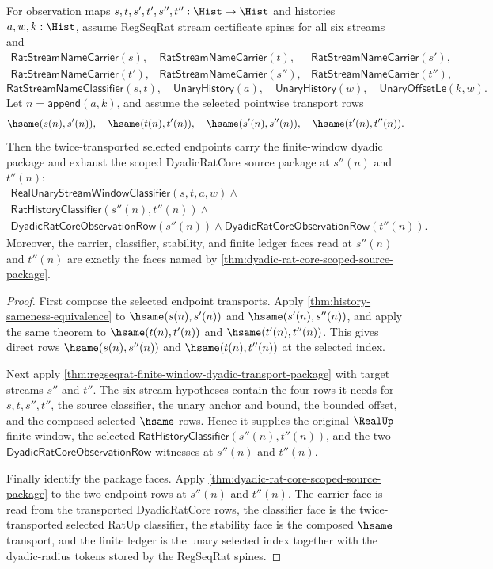 \begin{theorem}
\label{thm:regseqrat-finite-window-dyadic-transport-composition}
For observation maps $s,t,s',t',s'',t'':\Hist\to\Hist$ and histories
$a,w,k:\Hist$, assume RegSeqRat stream certificate spines for all six streams
and
$$
\begin{array}{lll}
\mathsf{RatStreamNameCarrier}(s),&
\mathsf{RatStreamNameCarrier}(t),&
\mathsf{RatStreamNameCarrier}(s'),\\
\mathsf{RatStreamNameCarrier}(t'),&
\mathsf{RatStreamNameCarrier}(s''),&
\mathsf{RatStreamNameCarrier}(t''),
\end{array}
$$
$$
\mathsf{RatStreamNameClassifier}(s,t),\quad
\mathsf{UnaryHistory}(a),\quad
\mathsf{UnaryHistory}(w),\quad
\mathsf{UnaryOffsetLe}(k,w).
$$
Let $n=\mathsf{append}(a,k)$, and assume the selected pointwise transport rows
$$
\hsame(s(n),s'(n)),\quad
\hsame(t(n),t'(n)),\quad
\hsame(s'(n),s''(n)),\quad
\hsame(t'(n),t''(n)).
$$
Then the twice-transported selected endpoints carry the finite-window dyadic
package and exhaust the scoped DyadicRatCore source package at $s''(n)$ and
$t''(n)$:
$$
\begin{array}{l}
\mathsf{RealUnaryStreamWindowClassifier}(s,t,a,w)\land\\
\mathsf{RatHistoryClassifier}(s''(n),t''(n))\land\\
\mathsf{DyadicRatCoreObservationRow}(s''(n))\land
\mathsf{DyadicRatCoreObservationRow}(t''(n)).
\end{array}
$$
Moreover, the carrier, classifier, stability, and finite ledger faces read at
$s''(n)$ and $t''(n)$ are exactly the faces named by
\autoref{thm:dyadic-rat-core-scoped-source-package}.
\end{theorem}
\begin{proof}
First compose the selected endpoint transports. Apply
\autoref{thm:history-sameness-equivalence} to
$\hsame(s(n),s'(n))$ and $\hsame(s'(n),s''(n))$, and apply the same theorem
to $\hsame(t(n),t'(n))$ and $\hsame(t'(n),t''(n))$. This gives direct rows
$\hsame(s(n),s''(n))$ and $\hsame(t(n),t''(n))$ at the selected index.

Next apply
\autoref{thm:regseqrat-finite-window-dyadic-transport-package} with target
streams $s''$ and $t''$. The six-stream hypotheses contain the four rows it
needs for $s,t,s'',t''$, the source classifier, the unary anchor and bound,
the bounded offset, and the composed selected $\hsame$ rows. Hence it supplies
the original $\RealUp$ finite window, the selected
$\mathsf{RatHistoryClassifier}(s''(n),t''(n))$, and the two
$\mathsf{DyadicRatCoreObservationRow}$ witnesses at $s''(n)$ and $t''(n)$.

Finally identify the package faces. Apply
\autoref{thm:dyadic-rat-core-scoped-source-package} to the two endpoint rows
at $s''(n)$ and $t''(n)$. The carrier face is read from the transported
DyadicRatCore rows, the classifier face is the twice-transported selected
RatUp classifier, the stability face is the composed $\hsame$ transport, and
the finite ledger is the unary selected index together with the dyadic-radius
tokens stored by the RegSeqRat spines.
\end{proof}

